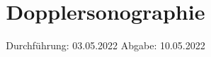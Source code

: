 

\subject{US3}
\title{Dopplersonographie}
\date{%
  Durchführung: 03.05.2022
  \hspace{3em}
  Abgabe: 10.05.2022
}



\maketitle
\thispagestyle{empty}
\tableofcontents
\newpage



\newpage

\newpage



\printbibliography{}


